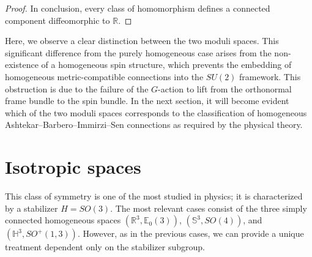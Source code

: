 \documentclass{article}
\numberwithin{equation}{section}
\theoremstyle{definition}
\newcommand{\R}{\mathbb{R}}
\begin{document}
\begin{proof}
    In conclusion, every class of homomorphism defines a connected component diffeomorphic to $\R$.
\end{proof}

Here, we observe a clear distinction between the two moduli spaces. This significant difference from the purely homogeneous case arises from the non-existence of a homogeneous spin structure, which prevents the embedding of homogeneous metric-compatible connections into the $SU(2)$ framework. This obstruction is due to the failure of the $G$-action to lift from the orthonormal frame bundle to the spin bundle. In the next section, it will become evident which of the two moduli spaces corresponds to the classification of homogeneous Ashtekar–Barbero–Immirzi–Sen connections as required by the physical theory.

\section{Isotropic spaces}
This class of symmetry is one of the most studied in physics; it is characterized by a stabilizer $H=SO(3)$. The most relevant cases consist of the three simply connected homogeneous spaces $(\R^3,\mathbb{E}_0(3))$, $(\mathbb{S}^3,SO(4))$, and $(\mathbb{H}^3,SO^+(1,3))$. However, as in the previous cases, we can provide a unique treatment dependent only on the stabilizer subgroup.

\medskip
\end{document}
